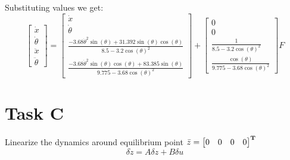 \documentclass[12pt,letterpaper]{article}
\begin{document}
    Substituting values we get:
    \begin{equation*}
        \begin{bmatrix}
            \dot x \\ \dot\theta \\ \ddot x \\ \ddot \theta 
        \end{bmatrix}
        =
        \begin{bmatrix}
            \dot x \\ \dot\theta 
            \\ \frac{-3.68 \dot\theta^2\sin(\theta) + 31.392\sin(\theta)\cos(\theta)}{8.5 - 3.2\cos(\theta)^2} 
            \\ \frac{-3.68\dot\theta^2\sin(\theta)\cos(\theta) + 83.385\sin(\theta)}{9.775 - 3.68\cos(\theta)^2} 
        \end{bmatrix}
        +
        \begin{bmatrix}
            0 \\ 0 
            \\ \frac{1}{8.5 - 3.2\cos(\theta)^2} 
            \\ \frac{\cos(\theta)}{9.775 - 3.68\cos(\theta)^2} 
        \end{bmatrix}
        F
    \end{equation*}

\section*{Task C}
\label{Q:C}
    Linearize the dynamics around equilibrium point $\bar z = \begin{bmatrix}
            0 & 0 
            & 0 
            & 0
        \end{bmatrix} ^\mathbf{T}$
    \begin{equation*}
        \delta \dot z = A\delta z + B \delta u
    \end{equation*}
    
\end{document}
